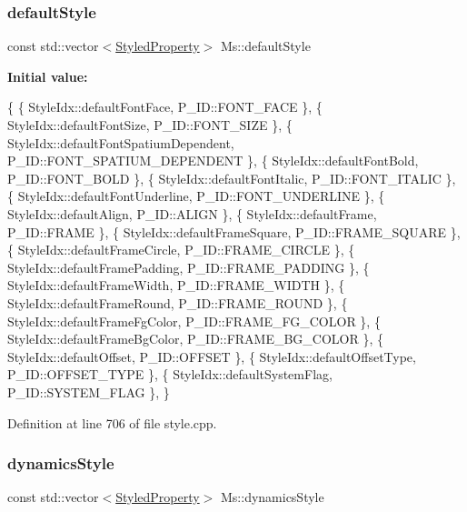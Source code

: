 \subsubsection{\texorpdfstring{default\+Style}{defaultStyle}}
{\footnotesize\ttfamily const std\+::vector$<$\hyperlink{struct_ms_1_1_styled_property}{Styled\+Property}$>$ Ms\+::default\+Style}

{\bfseries Initial value\+:}
\begin{DoxyCode}
\{
      \{ StyleIdx::defaultFontFace,                    P\_ID::FONT\_FACE              \},
      \{ StyleIdx::defaultFontSize,                    P\_ID::FONT\_SIZE              \},
      \{ StyleIdx::defaultFontSpatiumDependent,        P\_ID::FONT\_SPATIUM\_DEPENDENT \},
      \{ StyleIdx::defaultFontBold,                    P\_ID::FONT\_BOLD              \},
      \{ StyleIdx::defaultFontItalic,                  P\_ID::FONT\_ITALIC            \},
      \{ StyleIdx::defaultFontUnderline,               P\_ID::FONT\_UNDERLINE         \},
      \{ StyleIdx::defaultAlign,                       P\_ID::ALIGN                  \},
      \{ StyleIdx::defaultFrame,                       P\_ID::FRAME                  \},
      \{ StyleIdx::defaultFrameSquare,                 P\_ID::FRAME\_SQUARE           \},
      \{ StyleIdx::defaultFrameCircle,                 P\_ID::FRAME\_CIRCLE           \},
      \{ StyleIdx::defaultFramePadding,                P\_ID::FRAME\_PADDING          \},
      \{ StyleIdx::defaultFrameWidth,                  P\_ID::FRAME\_WIDTH            \},
      \{ StyleIdx::defaultFrameRound,                  P\_ID::FRAME\_ROUND            \},
      \{ StyleIdx::defaultFrameFgColor,                P\_ID::FRAME\_FG\_COLOR         \},
      \{ StyleIdx::defaultFrameBgColor,                P\_ID::FRAME\_BG\_COLOR         \},
      \{ StyleIdx::defaultOffset,                      P\_ID::OFFSET                 \},
      \{ StyleIdx::defaultOffsetType,                  P\_ID::OFFSET\_TYPE            \},
      \{ StyleIdx::defaultSystemFlag,                  P\_ID::SYSTEM\_FLAG            \},
      \}
\end{DoxyCode}


Definition at line 706 of file style.\+cpp.

\mbox{\label{namespace_ms_a543f738a86a431332108e7ee7d71cf1e}} 
\subsubsection{\texorpdfstring{dynamics\+Style}{dynamicsStyle}}
{\footnotesize\ttfamily const std\+::vector$<$\hyperlink{struct_ms_1_1_styled_property}{Styled\+Property}$>$ Ms\+::dynamics\+Style}

